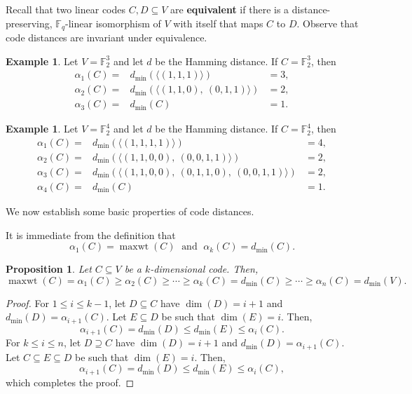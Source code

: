 \documentclass[12pt]{amsart}
\numberwithin{equation}{section}
\DeclareMathOperator{\maxwt}{maxwt}
\newtheorem{proposition}[theorem]{Proposition}
\theoremstyle{definition}
\newtheorem{example}[theorem]{Example}
\newcommand{\FF}{\mathbb{F}}
\begin{document}
Recall that two linear codes $C, D \subseteq V$ are {\bf equivalent} if there is a distance-preserving, $\FF_q$-linear isomorphism of $V$ with itself that maps $C$ to $D$. Observe that code distances are invariant under equivalence.

\begin{example}\label{25.01.01}
Let $V=\mathbb{F}_2^3$ and let $d$ be the Hamming distance. If $C=\mathbb{F}_2^3$, then
$$\begin{array}{ccc}
\alpha_1(C)=&d_{\min}(\langle (1,1,1)\rangle)&=3,\\
\alpha_2(C)=&d_{\min}(\langle (1,1,0),\ (0,1,1)\rangle)&=2,\\
\alpha_3(C)=&d_{\min}(C)&=1.
\end{array}$$
\end{example}

\begin{example}\label{25.01.02}
Let $V=\mathbb{F}_2^4$ and let $d$ be the Hamming distance. If $C=\mathbb{F}_2^4$, then
$$\begin{array}{ccc}
\alpha_1(C)=&d_{\min}(\langle (1,1,1,1)\rangle)&=4,\\
\alpha_2(C)=&d_{\min}(\langle (1,1,0,0),\ (0,0,1,1)\rangle)&=2,\\
\alpha_3(C)=&d_{\min}(\langle (1,1,0,0),\ (0,1,1,0),\ (0,0,1,1)\rangle)&=2,\\
\alpha_4(C)=&d_{\min}(C)&=1.
\end{array}$$
\end{example}

We now establish some basic properties of code distances.

\medskip

It is immediate from the definition that
\[
\alpha_1(C)=\maxwt(C) \;\mbox{ and }\; \alpha_k(C)=d_{\min}(C).
\]

\begin{proposition}\label{alphainequality}
Let $C \subseteq V$ be a $k$-dimensional code. Then,
$$\maxwt(C)=\alpha_1(C)\geq \alpha_2(C)\geq\cdots\geq\alpha_k(C)=d_{\min}(C)\geq \cdots\geq\alpha_n(C)=d_{\min}(V).$$
\end{proposition}
\begin{proof}
For $1\leq i\leq k-1$, let $D\subseteq C$ have $\dim(D)=i+1$ and $d_{\min}(D)=\alpha_{i+1}(C)$. Let $E\subseteq D$ be such that $\dim(E)=i$. Then,
$$\alpha_{i+1}(C)=d_{\min}(D)\leq d_{\min}(E)\leq \alpha_i(C).$$ For $k\leq i\leq n$, let $D\supseteq C$ have $\dim(D)=i+1$ and $d_{\min}(D)=\alpha_{i+1}(C)$. Let $C\subseteq E\subseteq D$ be such that $\dim(E)=i$. Then,
$$\alpha_{i+1}(C)=d_{\min}(D)\leq d_{\min}(E)\leq \alpha_i(C),$$
which completes the proof.
\end{proof}
\end{document}
